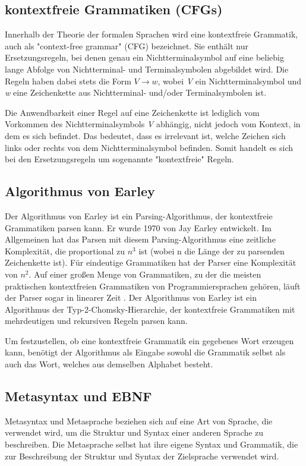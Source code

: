 \subsection*{kontextfreie Grammatiken (CFGs)}
Innerhalb der Theorie der formalen Sprachen wird eine kontextfreie Grammatik, auch als "context-free grammar" (CFG) bezeichnet. 
Sie enthält nur Ersetzungsregeln, bei denen genau ein Nichtterminalsymbol auf eine beliebig lange Abfolge von Nichtterminal- und Terminalsymbolen abgebildet wird.
Die Regeln haben dabei stets die Form $V \rightarrow w$, wobei \textit{V} ein Nichtterminalsymbol und \textit{w} eine Zeichenkette aus Nichtterminal- und/oder Terminalsymbolen ist.

Die Anwendbarkeit einer Regel auf eine Zeichenkette ist lediglich vom Vorkommen des Nichtterminalsymbols \textit{V} abhängig, nicht jedoch vom Kontext, in dem es 
sich befindet. Das bedeutet, dass es irrelevant ist, welche Zeichen sich links oder rechts von dem Nichtterminalsymbol befinden. Somit handelt es sich bei 
den Ersetzungsregeln um sogenannte "kontextfreie" Regeln.

\subsection*{Algorithmus von Earley}
Der Algorithmus von Earley ist ein Parsing-Algorithmus, der kontextfreie Grammatiken parsen kann. Er wurde 1970 von Jay Earley entwickelt.
Im Allgemeinen hat das Parsen mit diesem Parsing-Algorithmus eine zeitliche Komplexität, die proportional zu $n^3$ ist (wobei n die Länge der zu parsenden 
Zeichenkette ist). Für eindeutige Grammatiken hat der Parser eine Komplexität von $n^2$. Auf einer großen Menge von Grammatiken, zu der die 
meisten praktischen kontextfreien Grammatiken von Programmiersprachen gehören, läuft der Parser sogar in linearer Zeit \cite{Earley1970}. 
Der Algorithmus von Earley ist ein Algorithmus der Typ-2-Chomsky-Hierarchie, der kontextfreie Grammatiken mit mehrdeutigen und rekursiven Regeln parsen kann. 

Um festzustellen, ob eine kontextfreie Grammatik ein gegebenes Wort erzeugen kann, benötigt der Algorithmus als Eingabe sowohl die Grammatik selbst 
als auch das Wort, welches aus demselben Alphabet besteht.

\subsection*{Metasyntax und EBNF}

Metasyntax und Metasprache beziehen sich auf eine Art von Sprache, die verwendet wird, um die Struktur und Syntax einer anderen Sprache zu beschreiben. 
Die Metasprache selbst hat ihre eigene Syntax und Grammatik, die zur Beschreibung der Struktur und Syntax der Zielsprache verwendet wird.

